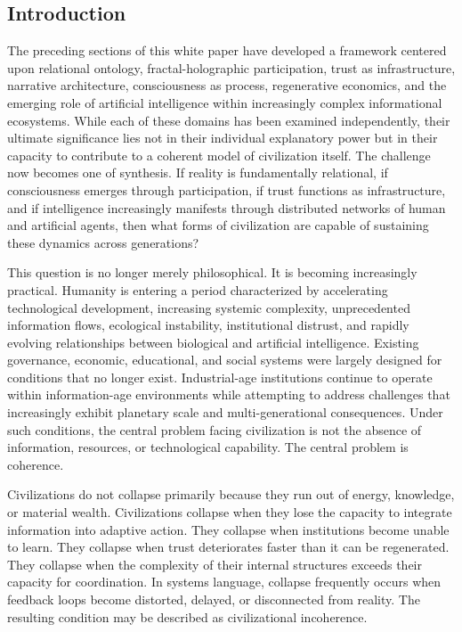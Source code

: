 \documentclass[12pt]{article}
\begin{document}
\subsection{Introduction}

The preceding sections of this white paper have developed a framework centered upon relational ontology, fractal-holographic participation, trust as infrastructure, narrative architecture, consciousness as process, regenerative economics, and the emerging role of artificial intelligence within increasingly complex informational ecosystems. While each of these domains has been examined independently, their ultimate significance lies not in their individual explanatory power but in their capacity to contribute to a coherent model of civilization itself. The challenge now becomes one of synthesis. If reality is fundamentally relational, if consciousness emerges through participation, if trust functions as infrastructure, and if intelligence increasingly manifests through distributed networks of human and artificial agents, then what forms of civilization are capable of sustaining these dynamics across generations?

This question is no longer merely philosophical. It is becoming increasingly practical. Humanity is entering a period characterized by accelerating technological development, increasing systemic complexity, unprecedented information flows, ecological instability, institutional distrust, and rapidly evolving relationships between biological and artificial intelligence. Existing governance, economic, educational, and social systems were largely designed for conditions that no longer exist. Industrial-age institutions continue to operate within information-age environments while attempting to address challenges that increasingly exhibit planetary scale and multi-generational consequences. Under such conditions, the central problem facing civilization is not the absence of information, resources, or technological capability. The central problem is coherence.

Civilizations do not collapse primarily because they run out of energy, knowledge, or material wealth. Civilizations collapse when they lose the capacity to integrate information into adaptive action. They collapse when institutions become unable to learn. They collapse when trust deteriorates faster than it can be regenerated. They collapse when the complexity of their internal structures exceeds their capacity for coordination. In systems language, collapse frequently occurs when feedback loops become distorted, delayed, or disconnected from reality. The resulting condition may be described as civilizational incoherence.
\end{document}
